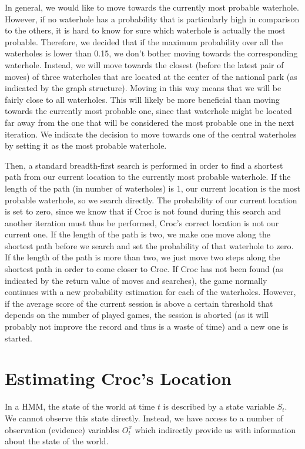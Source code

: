 \documentclass[a4paper]{article}
\begin{document}
In general, we would like to move towards the currently most probable
waterhole. However, if no waterhole has a probability that is particularly high in comparison to the others, it is hard to
know for sure which waterhole is actually the most probable. Therefore, we
decided that if the maximum probability over all the waterholes is lower than 0.15, we don't bother
moving towards the corresponding waterhole. Instead, we will move towards
the closest (before the latest pair of moves) of three waterholes that are
located at the center of the national 
park (as indicated by the graph structure). Moving in this way means that we will be fairly
close to all waterholes. This will likely be more beneficial than moving
towards the currently most probable one, since that waterhole might be located
far away from the one that will be considered the most probable one in the
next iteration. We indicate the decision to
move towards one of the central waterholes by setting it as the most probable
waterhole.

Then, a standard breadth-first search is performed in order to find a shortest path
from our current location to the currently most probable waterhole. If the
length of the path (in number of waterholes) is 1, our current location is the
most probable waterhole, so we search directly. The probability of our current
location is set to zero, since we know that if Croc is not found during this
search and another iteration must thus be performed, Croc's correct location
is not our current one. If the length of the path is two, we make one move
along the shortest path before we search and set the probability of that
waterhole to zero. If the length of the path is more than two, we just move
two steps along the shortest path in order to come closer to Croc. If Croc has
not been found (as indicated by the return value of moves and searches), the
game normally continues with a new probability estimation for each of the
waterholes. However, if the
average score of the current session is above a certain threshold that
depends on the number of played games, the session is aborted (as it will
probably not improve the record and thus is a waste of time) and a new one is started.

\section{Estimating Croc's Location}
\label{locate}

In a HMM, the state of the world at time $t$ is
described by a state variable $S_t$. We cannot observe this state
directly. Instead, we have access to a number of observation (evidence)
variables $O^x_t$ which indirectly provide us with information about the state
of the world.
\end{document}
